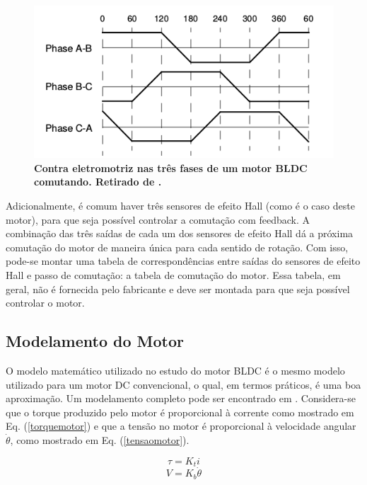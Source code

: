 \documentclass[10pt,fleqn,a4paper]{article}
\begin{document}
	\begin{figure}[ht]
		\begin{center}
			\includegraphics[angle=0, scale=0.5]{images/comutacao}
		\end{center}
		\caption{\textbf{Contra eletromotriz nas três fases de um motor BLDC comutando. Retirado de \cite{introducaobldc}.}}
		\label{fig:comutacao}
	\end{figure}
    
    
    Adicionalmente, é comum haver três sensores de efeito Hall (como é o caso deste motor), para que seja possível controlar a comutação com feedback. A combinação das três saídas de cada um dos sensores de efeito Hall dá a próxima comutação do motor de maneira única para cada sentido de rotação. Com isso, pode-se montar uma tabela de correspondências entre saídas do sensores de efeito Hall e passo de comutação: a tabela de comutação do motor. Essa tabela, em geral, não é fornecida pelo fabricante e deve ser montada para que seja possível controlar o motor.
    
    \subsection{Modelamento do Motor}
    
    O modelo matemático utilizado no estudo do motor BLDC é o mesmo modelo utilizado para um motor DC convencional, o qual, em termos práticos, é uma boa aproximação. Um modelamento completo pode ser encontrado em \cite{modelomotor}. Considera-se que o torque produzido pelo motor é proporcional à corrente como mostrado em Eq. (\ref{torquemotor}) e que a tensão no motor é proporcional à velocidade angular $\dot{\theta}$, como mostrado em Eq. (\ref{tensaomotor}).
    
    \begin{equation}
    \tau = K_ti \label{torquemotor}
    \end{equation}
    \begin{equation}
    V = K_b\dot{\theta} \label{tensaomotor}
    \end{equation}
    
\end{document}
